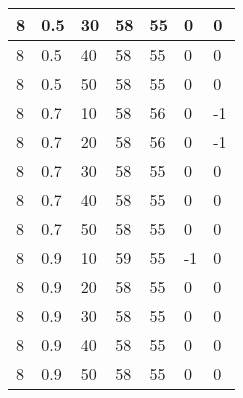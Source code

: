 \begin{longtable}{|l|l|l|l|l|l|l|}
		8     & 0.5 & 30   & 58 & 55 & 0   & 0   \\ \hline
		8     & 0.5 & 40   & 58 & 55 & 0   & 0   \\ \hline
		8     & 0.5 & 50   & 58 & 55 & 0   & 0   \\ \hline
		8     & 0.7 & 10   & 58 & 56 & 0   & -1  \\ \hline
		8     & 0.7 & 20   & 58 & 56 & 0   & -1  \\ \hline
		8     & 0.7 & 30   & 58 & 55 & 0   & 0   \\ \hline
		8     & 0.7 & 40   & 58 & 55 & 0   & 0   \\ \hline
		8     & 0.7 & 50   & 58 & 55 & 0   & 0   \\ \hline
		8     & 0.9 & 10   & 59 & 55 & -1  & 0   \\ \hline
		8     & 0.9 & 20   & 58 & 55 & 0   & 0   \\ \hline
		8     & 0.9 & 30   & 58 & 55 & 0   & 0   \\ \hline
		8     & 0.9 & 40   & 58 & 55 & 0   & 0   \\ \hline
		8     & 0.9 & 50   & 58 & 55 & 0   & 0   \\ \hline
	\end{longtable}

